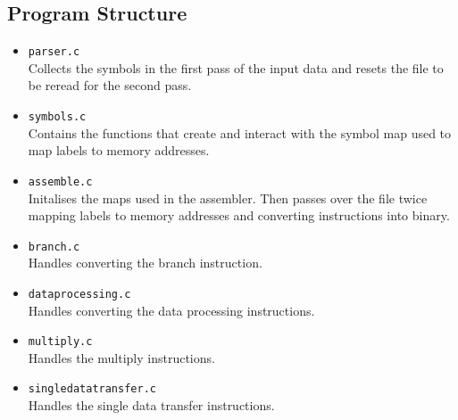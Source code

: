 \documentclass[8pt]{article}
\begin{document}
\begin{minipage}{0.45\textwidth}
\subsection{Program Structure}

\begin{itemize}
    \item \texttt{parser.c} \\Collects the symbols in the first pass of the
    input data and resets the file to be reread for the second pass.
    \item \texttt{symbols.c} \\Contains the functions that create and interact with the
    symbol map used to map labels to memory addresses.
    \item \texttt{assemble.c} \\Initalises the maps used in the assembler. Then
    passes over the file twice mapping labels to memory addresses and converting
    instructions into binary.
    \item \texttt{branch.c} \\Handles converting the branch instruction.
    \item \texttt{dataprocessing.c} \\Handles converting the data processing
    instructions.
    \item \texttt{multiply.c} \\Handles the multiply instructions.
    \item \texttt{singledatatransfer.c} \\Handles the single data transfer instructions.
\end{itemize}
\end{minipage}%
\hfill
\end{document}

